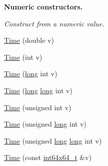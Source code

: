 \begin{Indent}{\bf Numeric constructors.}\par
{\em Construct from a numeric value. }\begin{DoxyCompactItemize}
\item 
\hyperlink{classns3_1_1Time_a669850f75fa7e3e90ebed6d5e9e26fe5}{Time} (double v)
\item 
\hyperlink{classns3_1_1Time_ab20ebe69b8c6d5a3f2b01c8cf907b47e}{Time} (int v)
\item 
\hyperlink{classns3_1_1Time_aee3397d2096a21d6aa69a7dae4484614}{Time} (\hyperlink{generate__test__data__lte__sinr_8m_a0eab6be67e93c3411f7a8b53cc297285}{long} int v)
\item 
\hyperlink{classns3_1_1Time_a3e3e79bd1493822c4534b758759dbcdd}{Time} (\hyperlink{generate__test__data__lte__sinr_8m_a0eab6be67e93c3411f7a8b53cc297285}{long} \hyperlink{generate__test__data__lte__sinr_8m_a0eab6be67e93c3411f7a8b53cc297285}{long} int v)
\item 
\hyperlink{classns3_1_1Time_abf1a1fa6a98401e75e7b3541ecb02c1c}{Time} (unsigned int v)
\item 
\hyperlink{classns3_1_1Time_a3280a8d2624392b85fc6c52ec343a3bc}{Time} (unsigned \hyperlink{generate__test__data__lte__sinr_8m_a0eab6be67e93c3411f7a8b53cc297285}{long} int v)
\item 
\hyperlink{classns3_1_1Time_a71c6596c4d8d8460d40f2527777ece8f}{Time} (unsigned \hyperlink{generate__test__data__lte__sinr_8m_a0eab6be67e93c3411f7a8b53cc297285}{long} \hyperlink{generate__test__data__lte__sinr_8m_a0eab6be67e93c3411f7a8b53cc297285}{long} int v)
\item 
\hyperlink{classns3_1_1Time_a241ce5bcbc068ec623a4626c1258e24b}{Time} (const \hyperlink{classint64x64__t}{int64x64\+\_\+t} \&v)
\end{DoxyCompactItemize}
\end{Indent}
